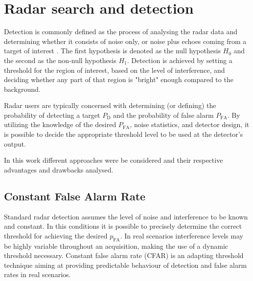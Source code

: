 
	\section{Radar search and detection}
		Detection is commonly defined as the process of analysing the radar data and determining whether it consists of noise only, or noise plus echoes coming from a target of interest \cite{Richards_Scheer_Holm_2010}. 
		The first hypothesis is denoted as the null hypothesis $H_0$ and the second as the non-null hypothesis $H_1$.
		Detection is achieved by setting a threshold for the region of interest, based on the level of interference, and deciding whether any part of that region is "bright" enough compared to the background.
		
		
		Radar users are typically concerned with determining (or defining) the probability of detecting a target $P_\text{D}$ and the probability of false alarm $P_\text{{FA}}$.  By utilizing the knowledge of the desired $P_\text{{FA}}$, noise statistics, and detector design, it is possible to decide the appropriate threshold level to be used at the detector's output.
		
		
		
		
		
		In this work different approaches were be considered and their respective advantages and drawbacks analysed. 



		\subsection{Constant False Alarm Rate}
	
				Standard radar detection assumes the level of noise and interference to be known and constant. In this conditions it is possible to precisely determine the correct threshold for achieving the desired $	p_\text{FA}$. In real scenarios interference levels may be highly variable throughout an acquisition, making the use of a dynamic threshold necessary. Constant false alarm rate (CFAR) is an adapting threshold technique aiming at providing predictable behaviour of detection and false alarm rates in real scenarios.
				
